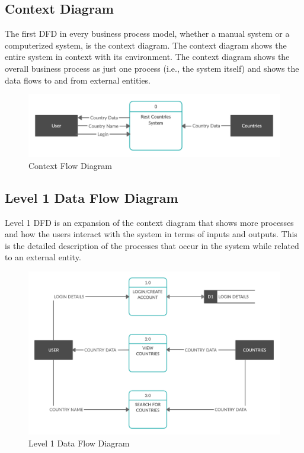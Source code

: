\documentclass[twoside, a4paper, 12pt]{report}
\begin{document}
\subsection{Context Diagram}
The first DFD in every business process model, whether a manual system or a computerized system, is the context diagram. The context diagram shows the entire system in context with its environment. The context diagram shows the overall business process as just one process (i.e., the system itself) and shows the data flows to and from external entities.

\begin{figure} [ht]
	\centering
	\includegraphics[width=1.0\textwidth]{CFD.png}
	\caption{Context Flow Diagram}
	\label{fig:context-flow-diagram}
\end{figure}

\subsection{Level 1 Data Flow Diagram}
Level 1 DFD is an expansion of the context diagram that shows more processes and how the users interact with the system in terms of inputs and outputs. This is the detailed description of the processes that occur in the system while related to an external entity.

\begin{figure} [ht]
	\centering
	\includegraphics[width=1.0\textwidth]{DFD.png}
	\caption{Level 1 Data Flow Diagram}
	\label{fig:level-1-data-flow-diagram}
\end{figure}
\end{document}
